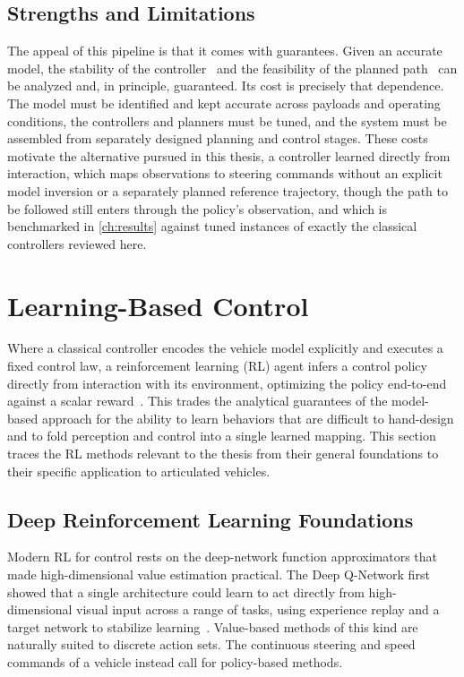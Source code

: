 \subsection{Strengths and Limitations}
The appeal of this pipeline is that it comes with guarantees. Given an accurate model, the stability of the controller~\cite{mayne2000constrained, samson1995chained} and the feasibility of the planned path~\cite{lavalle2006planning, karaman2011sampling} can be analyzed and, in principle, guaranteed. Its cost is precisely that dependence. The model must be identified and kept accurate across payloads and operating conditions, the controllers and planners must be tuned, and the system must be assembled from separately designed planning and control stages. These costs motivate the alternative pursued in this thesis, a controller learned directly from interaction, which maps observations to steering commands without an explicit model inversion or a separately planned reference trajectory, though the path to be followed still enters through the policy's observation, and which is benchmarked in \cref{ch:results} against tuned instances of exactly the classical controllers reviewed here.

\section{Learning-Based Control}

Where a classical controller encodes the vehicle model explicitly and executes a fixed control law, a reinforcement learning (RL) agent infers a control policy directly from interaction with its environment, optimizing the policy end-to-end against a scalar reward~\cite{sutton2018rl}. This trades the analytical guarantees of the model-based approach for the ability to learn behaviors that are difficult to hand-design and to fold perception and control into a single learned mapping. This section traces the RL methods relevant to the thesis from their general foundations to their specific application to articulated vehicles.

\subsection{Deep Reinforcement Learning Foundations}
Modern RL for control rests on the deep-network function approximators that made high-dimensional value estimation practical. The Deep Q-Network first showed that a single architecture could learn to act directly from high-dimensional visual input across a range of tasks, using experience replay and a target network to stabilize learning~\cite{mnih2015dqn}. Value-based methods of this kind are naturally suited to discrete action sets. The continuous steering and speed commands of a vehicle instead call for policy-based methods.

